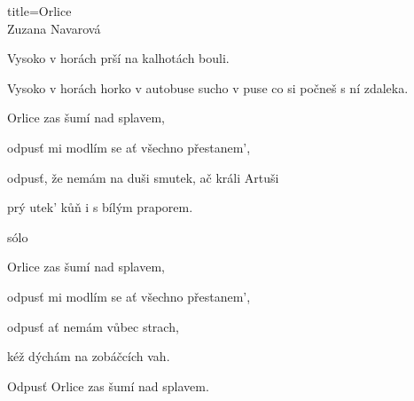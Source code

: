 \begin{song}{title=\centering Orlice \\\normalsize Zuzana Navarová  \vspace*{-0.3cm}}
{	Vysoko v horách prší na kalhotách bouli. 
	
	Vysoko v horách horko v autobuse sucho v puse co si počneš s ní zdaleka. 
	
\sloka
	Orlice zas šumí nad splavem, 
	
	odpusť mi modlím se ať všechno přestanem', 
	
	odpusť, že nemám na duši smutek, ač králi Artuši 
	
	prý utek' kůň i s bílým praporem. 
	
sólo

\sloka
	Orlice zas šumí nad splavem, 
	
	odpusť mi modlím se ať všechno přestanem', 
	
	odpusť ať nemám vůbec strach,
	
	kéž dýchám na zobáčcích vah.
	
	Odpusť Orlice zas šumí nad splavem.
	
}
\setcounter{Slokočet}{0}
\end{song}
